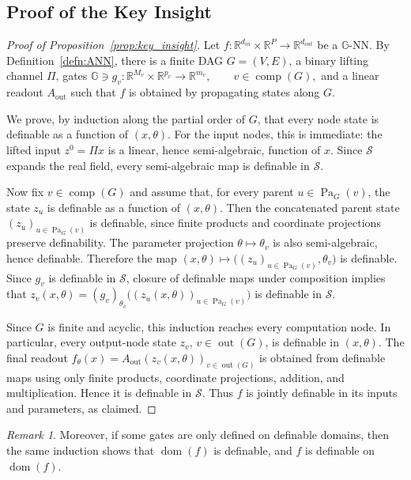 \documentclass{article}
\theoremstyle{plain}
\theoremstyle{definition}
\theoremstyle{remark}
\newtheorem{remark}[theorem]{Remark}
\theoremstyle{plain}
\numberwithin{thm}{section}
\theoremstyle{definition}
\numberwithin{equation}{section}
\begin{document}
\subsection{Proof of the Key Insight}
\label{s:Proof_KeyInsight}
\begin{proof}[{Proof of Proposition~\ref{prop:key_insight}}]
Let $f:\mathbb{R}^{d_{in}}\times\mathbb{R}^P\to\mathbb{R}^{d_{out}}$ be a $\mathbb{G}$-NN.  By Definition~\ref{defn:ANN}, there is a finite DAG $G=(V,E)$, a binary lifting channel $\Pi$, gates
$
    \mathbb{G}\ni g_v:\mathbb{R}^{M_v}\times\mathbb{R}^{p_v}\to\mathbb{R}^{m_v},
    \qquad v\in\operatorname{comp}(G),
$
and a linear readout $A_{\operatorname{out}}$ such that $f$ is obtained by propagating states along $G$.

We prove, by induction along the partial order of $G$, that every node state is definable as a function of $(x,\theta)$.  For the input nodes, this is immediate: the lifted input
$
    z^0=\Pi x
$
is a linear, hence semi-algebraic, function of $x$.  Since $\mathcal{S}$ expands the real field, every semi-algebraic map is definable in $\mathcal{S}$.

Now fix $v\in\operatorname{comp}(G)$ and assume that, for every parent $u\in\operatorname{Pa}_G(v)$, the state $z_u$ is definable as a function of $(x,\theta)$.  Then the concatenated parent state
$
    (z_u)_{u\in\operatorname{Pa}_G(v)}
$
is definable, since finite products and coordinate projections preserve definability.  The parameter projection $\theta\mapsto \theta_v$ is also semi-algebraic, hence definable.  Therefore the map
$
    (x,\theta)
    \longmapsto
        \Big(
            (z_u)_{u\in\operatorname{Pa}_G(v)},
            \theta_v
        \Big)
$
is definable.  Since $g_v$ is definable in $\mathcal{S}$, closure of definable maps under composition implies that
$
    z_v(x,\theta)
    =
        (g_v)_{\theta_v}
        \big(
            (z_u(x,\theta))_{u\in\operatorname{Pa}_G(v)}
        \big)
$
is definable in $\mathcal{S}$.

Since $G$ is finite and acyclic, this induction reaches every computation node.  In particular, every output-node state $z_v$, $v\in\operatorname{out}(G)$, is definable in $(x,\theta)$.  The final readout
$
    f_{\theta}(x)
    =
        A_{\operatorname{out}}
        (z_v(x,\theta))_{v\in\operatorname{out}(G)}
$
is obtained from definable maps using only finite products, coordinate projections, addition, and multiplication.  Hence it is definable in $\mathcal{S}$.  Thus $f$ is jointly definable in its inputs and parameters, as claimed.
\end{proof}
\begin{remark}
Moreover, if some gates are only defined on definable domains, then the same induction shows that $\operatorname{dom}(f)$ is definable, and $f$ is definable on $\operatorname{dom}(f)$.
\end{remark}
\end{document}
